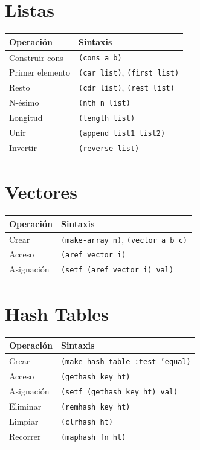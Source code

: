 \section*{Listas}

\begin{center}
\begin{tabular}{ll}
\toprule
\textbf{Operación} & \textbf{Sintaxis} \\
\midrule
Construir cons & \texttt{(cons a b)} \\
Primer elemento & \texttt{(car list)}, \texttt{(first list)} \\
Resto & \texttt{(cdr list)}, \texttt{(rest list)} \\
N-ésimo & \texttt{(nth n list)} \\
Longitud & \texttt{(length list)} \\
Unir & \texttt{(append list1 list2)} \\
Invertir & \texttt{(reverse list)} \\
\bottomrule
\end{tabular}
\end{center}

\section*{Vectores}

\begin{center}
\begin{tabular}{ll}
\toprule
\textbf{Operación} & \textbf{Sintaxis} \\
\midrule
Crear & \texttt{(make-array n)}, \texttt{(vector a b c)} \\
Acceso & \texttt{(aref vector i)} \\
Asignación & \texttt{(setf (aref vector i) val)} \\
\bottomrule
\end{tabular}
\end{center}

\section*{Hash Tables}

\begin{center}
\begin{tabular}{ll}
\toprule
\textbf{Operación} & \textbf{Sintaxis} \\
\midrule
Crear & \texttt{(make-hash-table :test 'equal)} \\
Acceso & \texttt{(gethash key ht)} \\
Asignación & \texttt{(setf (gethash key ht) val)} \\
Eliminar & \texttt{(remhash key ht)} \\
Limpiar & \texttt{(clrhash ht)} \\
Recorrer & \texttt{(maphash fn ht)} \\
\bottomrule
\end{tabular}
\end{center}

